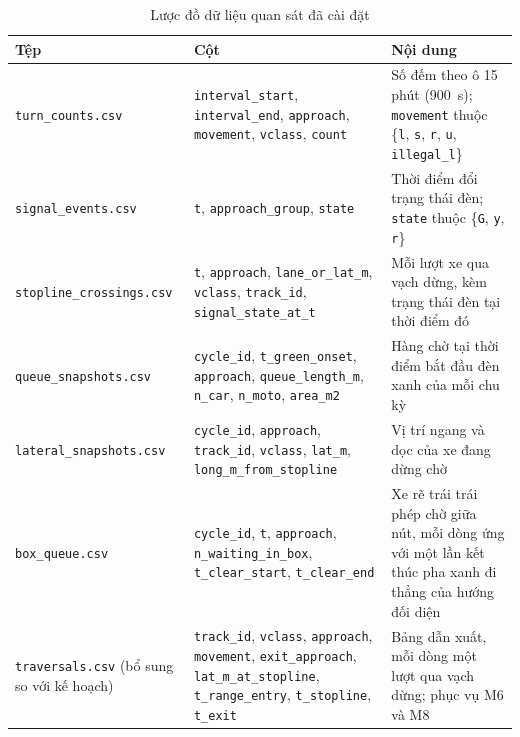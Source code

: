 \documentclass[../DoAn.tex]{subfiles}
\begin{document}
\begin{table}[H]
\centering
\small\setlength{\tabcolsep}{3pt}
\begin{tabular}{|p{3.3cm}|p{5.4cm}|p{4.3cm}|}
\hline
\textbf{Tệp} & \textbf{Cột} & \textbf{Nội dung} \\ \hline
\texttt{turn\_\allowbreak counts.csv} & \texttt{interval\_\allowbreak start}, \texttt{interval\_\allowbreak end}, \texttt{approach}, \texttt{movement}, \texttt{vclass}, \texttt{count} & Số đếm theo ô 15 phút (900~s); \texttt{movement} thuộc \{\texttt{l}, \texttt{s}, \texttt{r}, \texttt{u}, \texttt{illegal\_\allowbreak l}\} \\ \hline
\texttt{signal\_\allowbreak events.csv} & \texttt{t}, \texttt{approach\_\allowbreak group}, \texttt{state} & Thời điểm đổi trạng thái đèn; \texttt{state} thuộc \{\texttt{G}, \texttt{y}, \texttt{r}\} \\ \hline
\texttt{stopline\_\allowbreak crossings.csv} & \texttt{t}, \texttt{approach}, \texttt{lane\_\allowbreak or\_\allowbreak lat\_\allowbreak m}, \texttt{vclass}, \texttt{track\_\allowbreak id}, \texttt{signal\_\allowbreak state\_\allowbreak at\_\allowbreak t} & Mỗi lượt xe qua vạch dừng, kèm trạng thái đèn tại thời điểm đó \\ \hline
\texttt{queue\_\allowbreak snapshots.csv} & \texttt{cycle\_\allowbreak id}, \texttt{t\_\allowbreak green\_\allowbreak onset}, \texttt{approach}, \texttt{queue\_\allowbreak length\_\allowbreak m}, \texttt{n\_\allowbreak car}, \texttt{n\_\allowbreak moto}, \texttt{area\_\allowbreak m2} & Hàng chờ tại thời điểm bắt đầu đèn xanh của mỗi chu kỳ \\ \hline
\texttt{lateral\_\allowbreak snapshots.csv} & \texttt{cycle\_\allowbreak id}, \texttt{approach}, \texttt{track\_\allowbreak id}, \texttt{vclass}, \texttt{lat\_\allowbreak m}, \texttt{long\_\allowbreak m\_\allowbreak from\_\allowbreak stopline} & Vị trí ngang và dọc của xe đang dừng chờ \\ \hline
\texttt{box\_\allowbreak queue.csv} & \texttt{cycle\_\allowbreak id}, \texttt{t}, \texttt{approach}, \texttt{n\_\allowbreak waiting\_\allowbreak in\_\allowbreak box}, \texttt{t\_\allowbreak clear\_\allowbreak start}, \texttt{t\_\allowbreak clear\_\allowbreak end} & Xe rẽ trái trái phép chờ giữa nút, mỗi dòng ứng với một lần kết thúc pha xanh đi thẳng của hướng đối diện \\ \hline
\texttt{traversals.csv} (bổ sung so với kế hoạch) & \texttt{track\_\allowbreak id}, \texttt{vclass}, \texttt{approach}, \texttt{movement}, \texttt{exit\_\allowbreak approach}, \texttt{lat\_\allowbreak m\_\allowbreak at\_\allowbreak stopline}, \texttt{t\_\allowbreak range\_\allowbreak entry}, \texttt{t\_\allowbreak stopline}, \texttt{t\_\allowbreak exit} & Bảng dẫn xuất, mỗi dòng một lượt qua vạch dừng; phục vụ M6 và M8 \\ \hline
\end{tabular}
\caption{Lược đồ dữ liệu quan sát đã cài đặt}
\label{table:appendix_schema}
\end{table}
\end{document}
